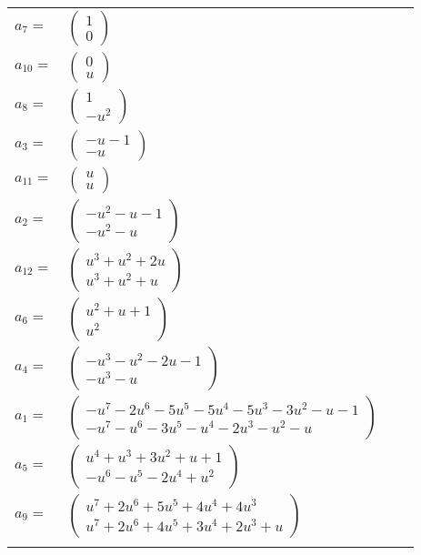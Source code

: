 \documentclass[1p]{elsarticle_modified}
\theoremstyle{definition}
\begin{document}
\begin{tabular}{m{7pt} m{180pt} m{7pt} m{180pt} }
\flushright $a_{7}=$&$\begin{pmatrix}1\\0\end{pmatrix}$ \\
\flushright $a_{10}=$&$\begin{pmatrix}0\\u\end{pmatrix}$ \\
\flushright $a_{8}=$&$\begin{pmatrix}1\\- u^2\end{pmatrix}$ \\
\flushright $a_{3}=$&$\begin{pmatrix}- u-1\\- u\end{pmatrix}$ \\
\flushright $a_{11}=$&$\begin{pmatrix}u\\u\end{pmatrix}$ \\
\flushright $a_{2}=$&$\begin{pmatrix}- u^2- u-1\\- u^2- u\end{pmatrix}$ \\
\flushright $a_{12}=$&$\begin{pmatrix}u^3+u^2+2 u\\u^3+u^2+u\end{pmatrix}$ \\
\flushright $a_{6}=$&$\begin{pmatrix}u^2+u+1\\u^2\end{pmatrix}$ \\
\flushright $a_{4}=$&$\begin{pmatrix}- u^3- u^2-2 u-1\\- u^3- u\end{pmatrix}$ \\
\flushright $a_{1}=$&$\begin{pmatrix}- u^7-2 u^6-5 u^5-5 u^4-5 u^3-3 u^2- u-1\\- u^7- u^6-3 u^5- u^4-2 u^3- u^2- u\end{pmatrix}$ \\
\flushright $a_{5}=$&$\begin{pmatrix}u^4+u^3+3 u^2+u+1\\- u^6- u^5-2 u^4+u^2\end{pmatrix}$ \\
\flushright $a_{9}=$&$\begin{pmatrix}u^7+2 u^6+5 u^5+4 u^4+4 u^3\\u^7+2 u^6+4 u^5+3 u^4+2 u^3+u\end{pmatrix}$\\&\end{tabular}
\end{document}
